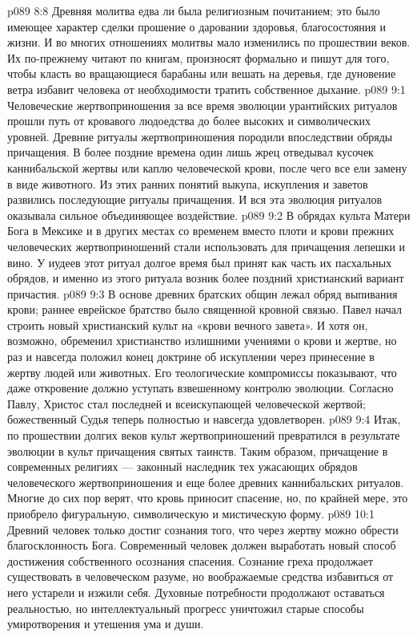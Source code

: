 \vs p089 8:8 Древняя молитва едва ли была религиозным почитанием; это было имеющее характер сделки прошение о даровании здоровья, благосостояния и жизни. И во многих отношениях молитвы мало изменились по прошествии веков. Их по\hyp{}прежнему читают по книгам, произносят формально и пишут для того, чтобы класть во вращающиеся барабаны или вешать на деревья, где дуновение ветра избавит человека от необходимости тратить собственное дыхание.
\vs p089 9:1 Человеческие жертвоприношения за все время эволюции урантийских ритуалов прошли путь от кровавого людоедства до более высоких и символических уровней. Древние ритуалы жертвоприношения породили впоследствии обряды причащения. В более поздние времена один лишь жрец отведывал кусочек каннибальской жертвы или каплю человеческой крови, после чего все ели замену в виде животного. Из этих ранних понятий выкупа, искупления и заветов развились последующие ритуалы причащения. И вся эта эволюция ритуалов оказывала сильное объединяющее воздействие.
\vs p089 9:2 В обрядах культа Матери Бога в Мексике и в других местах со временем вместо плоти и крови прежних человеческих жертвоприношений стали использовать для причащения лепешки и вино. У иудеев этот ритуал долгое время был принят как часть их пасхальных обрядов, и именно из этого ритуала возник более поздний христианский вариант причастия.
\vs p089 9:3 В основе древних братских общин лежал обряд выпивания крови; раннее еврейское братство было священной кровной связью. Павел начал строить новый христианский культ на «крови вечного завета». И хотя он, возможно, обременил христианство излишними учениями о крови и жертве, но раз и навсегда положил конец доктрине об искуплении через принесение в жертву людей или животных. Его теологические компромиссы показывают, что даже откровение должно уступать взвешенному контролю эволюции. Согласно Павлу, Христос стал последней и всеискупающей человеческой жертвой; божественный Судья теперь полностью и навсегда удовлетворен.
\vs p089 9:4 Итак, по прошествии долгих веков культ жертвоприношений превратился в результате эволюции в культ причащения святых таинств. Таким образом, причащение в современных религиях --- законный наследник тех ужасающих обрядов человеческого жертвоприношения и еще более древних каннибальских ритуалов. Многие до сих пор верят, что кровь приносит спасение, но, по крайней мере, это приобрело фигуральную, символическую и мистическую форму.
\vs p089 10:1 Древний человек только достиг сознания того, что через жертву можно обрести благосклонность Бога. Современный человек должен выработать новый способ достижения собственного осознания спасения. Сознание греха продолжает существовать в человеческом разуме, но воображаемые средства избавиться от него устарели и изжили себя. Духовные потребности продолжают оставаться реальностью, но интеллектуальный прогресс уничтожил старые способы умиротворения и утешения ума и души.
